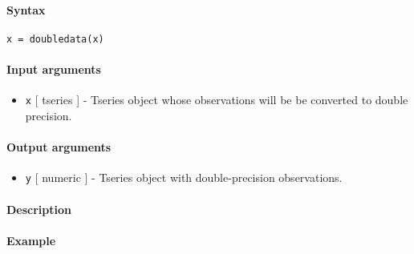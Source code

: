 


	\paragraph{Syntax}\label{syntax}

\begin{verbatim}
x = doubledata(x)
\end{verbatim}

\paragraph{Input arguments}\label{input-arguments}

\begin{itemize}
\itemsep1pt\parskip0pt
\item
  \texttt{x} {[} tseries {]} - Tseries object whose observations will be
  be converted to double precision.
\end{itemize}

\paragraph{Output arguments}\label{output-arguments}

\begin{itemize}
\itemsep1pt\parskip0pt
\item
  \texttt{y} {[} numeric {]} - Tseries object with double-precision
  observations.
\end{itemize}

\paragraph{Description}\label{description}

\paragraph{Example}\label{example}


